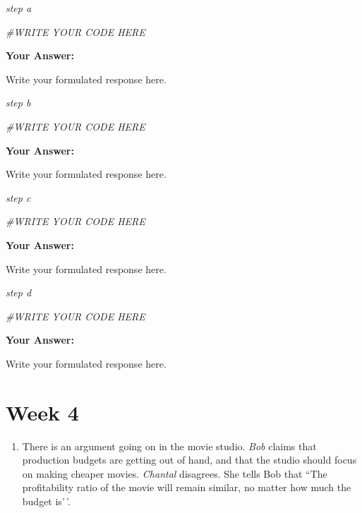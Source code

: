 \documentclass[
]{article}
\newenvironment{Shaded}{\begin{snugshade}}{\end{snugshade}}
\newcommand{\CommentTok}[1]{\textcolor[rgb]{0.56,0.35,0.01}{\textit{#1}}}
\providecommand{\tightlist}{%
  \setlength{\itemsep}{0pt}\setlength{\parskip}{0pt}}
\begin{document}
\emph{step a}

\begin{Shaded}
\begin{Highlighting}[]
\CommentTok{\#WRITE YOUR CODE HERE}
\end{Highlighting}
\end{Shaded}

\textbf{Your Answer:}

Write your formulated response here.

\emph{step b}

\begin{Shaded}
\begin{Highlighting}[]
\CommentTok{\#WRITE YOUR CODE HERE}
\end{Highlighting}
\end{Shaded}

\textbf{Your Answer:}

Write your formulated response here.

\emph{step c}

\begin{Shaded}
\begin{Highlighting}[]
\CommentTok{\#WRITE YOUR CODE HERE}
\end{Highlighting}
\end{Shaded}

\textbf{Your Answer:}

Write your formulated response here.

\emph{step d}

\begin{Shaded}
\begin{Highlighting}[]
\CommentTok{\#WRITE YOUR CODE HERE}
\end{Highlighting}
\end{Shaded}

\textbf{Your Answer:}

Write your formulated response here.

\section{Week 4}\label{week-4}

\begin{enumerate}
\def\labelenumi{\arabic{enumi}.}
\tightlist
\item
  There is an argument going on in the movie studio. \emph{Bob} claims
  that production budgets are getting out of hand, and that the studio
  should focus on making cheaper movies. \emph{Chantal} disagrees. She
  tells Bob that ``The profitability ratio of the movie will remain
  similar, no matter how much the budget is'\,'.
\end{enumerate}
\end{document}
